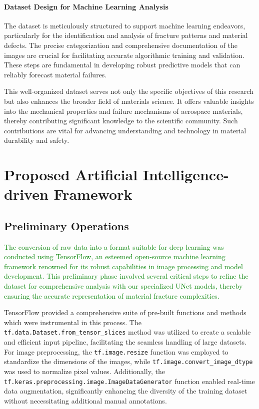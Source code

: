 \documentclass[preprint,12pt]{elsarticle}
\begin{document}
\paragraph{Dataset Design for Machine Learning Analysis}
The dataset is meticulously structured to support machine learning endeavors, particularly for the identification and analysis of fracture patterns and material defects. The precise categorization and comprehensive documentation of the images are crucial for facilitating accurate algorithmic training and validation. These steps are fundamental in developing robust predictive models that can reliably forecast material failures.

This well-organized dataset serves not only the specific objectives of this research but also enhances the broader field of materials science. It offers valuable insights into the mechanical properties and failure mechanisms of aerospace materials, thereby contributing significant knowledge to the scientific community. Such contributions are vital for advancing understanding and technology in material durability and safety.



\vspace{\baselineskip}
\vspace{\baselineskip}
\vspace{\baselineskip}






\section{Proposed Artificial Intelligence-driven Framework}
\label{Sec: Proposed Artificial Intelligence-driven Framework}
\subsection{Preliminary Operations}
\label{subsec:preliminary_operations}

\textcolor{green}{The conversion of raw data into a format suitable for deep learning was conducted using TensorFlow, an esteemed open-source machine learning framework renowned for its robust capabilities in image processing and model development. This preliminary phase involved several critical steps to refine the dataset for comprehensive analysis with our specialized UNet models, thereby ensuring the accurate representation of material fracture complexities. }

TensorFlow provided a comprehensive suite of pre-built functions and methods which were instrumental in this process. The \texttt{tf.data.Dataset.from\_tensor\_slices} method was utilized to create a scalable and efficient input pipeline, facilitating the seamless handling of large datasets. For image preprocessing, the \texttt{tf.image.resize} function was employed to standardize the dimensions of the images, while \texttt{tf.image.convert\_image\_dtype} was used to normalize pixel values. Additionally, the \texttt{tf.keras.preprocessing.image.ImageDataGenerator} function enabled real-time data augmentation, significantly enhancing the diversity of the training dataset without necessitating additional manual annotations.
\end{document}
